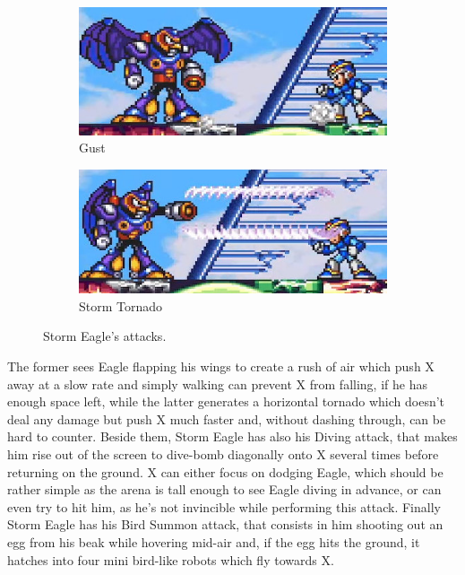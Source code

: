 \begin{figure}[htp]
\begin{subfigure}{0.35\linewidth}
	\end{subfigure}
	\begin{subfigure}{0.4\linewidth}
		\centering
		\includegraphics[width=\linewidth]{figures/X1/Storm_eagle/Eagle_push.jpg}
		\caption{Gust}
	\end{subfigure}
	\begin{subfigure}{0.4\linewidth}
		\centering
		\includegraphics[width=\linewidth]{figures/X1/Storm_eagle/Eagle_tornado.jpg}
		\caption{Storm Tornado}
	\end{subfigure}
	\caption{Storm Eagle's attacks.}
\end{figure}


The former sees Eagle flapping his wings to create a rush of air which push X away at a slow rate and simply walking can prevent X from falling, if he has enough space left, while the latter generates a horizontal tornado which doesn't deal any damage but push X much faster and, without dashing through, can be hard to counter. Beside them, Storm Eagle has also his Diving attack, that makes him rise out of the screen to dive-bomb diagonally onto X several times before returning on the ground. X can either focus on dodging Eagle, which should be rather simple as the arena is tall enough to see Eagle diving in advance, or can even try to hit him, as he's not invincible while performing this attack. Finally Storm Eagle has his Bird Summon attack, that consists in him shooting out an egg from his beak while hovering mid-air and, if the egg hits the ground, it hatches into four mini bird-like robots which fly towards X. 

